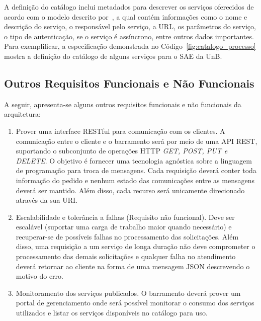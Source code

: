 A definição do catálogo inclui metadados para descrever os serviços oferecidos
de acordo com o modelo descrito por~\cite{OASISRefArch:2012}, a qual 
contém informações como o nome e descrição do serviço, o responsável pelo serviço, 
a \acrshort{URL}, os parâmetros do serviço, o tipo de autenticação, 
se o serviço é assíncrono, entre outros dados importantes. 
Para exemplificar, a especificação demonstrada
no Código~\ref{fig:catalogo_processo} mostra 
a definição do catálogo de alguns serviços para o \acrfull{SAE} da \acrshort{UnB}.



\subsection{Outros Requisitos Funcionais e Não Funcionais}\label{outros_req}

A seguir, apresenta-se alguns outros requisitos funcionais e não funcionais da arquitetura:

\begin{enumerate}[(RQ1)]

\item Prover uma interface RESTful para comunicação com os clientes. A comunicação 
entre o cliente e o barramento será por meio de uma \acrshort{API} \acrshort{REST}, 
suportando o subconjunto de operações \acrshort{HTTP} \textit{GET, POST, PUT e DELETE}. 
O objetivo \'{e} fornecer uma tecnologia agnóstica sobre a linguagem de programa\c c\~{a}o
para troca de mensagens. Cada requisição deverá conter toda informação do 
pedido e nenhum estado das comunicações entre as mensagens deverá ser mantido. 
Além disso, cada recurso será unicamente direcionado através da sua \acrshort{URI}.


\item Escalabilidade e tolerância a falhas (Requisito não funcional). Deve ser
escalável (suportar uma carga de trabalho maior quando necessário) e recuperar-se
de possíveis falhas no processamento das solicitações. Além disso, 
uma requisição a um serviço de longa duração não deve comprometer o processamento 
das demais solicitações e qualquer falha no atendimento deverá retornar ao cliente 
na forma de uma mensagem \acrshort{JSON} descrevendo o motivo do erro.


\item Monitoramento dos serviços publicados. O barramento deverá prover um portal de 
gerenciamento onde será possível monitorar o consumo dos serviços utilizados e 
listar os serviços disponíveis no catálogo para uso.

\end{enumerate}



